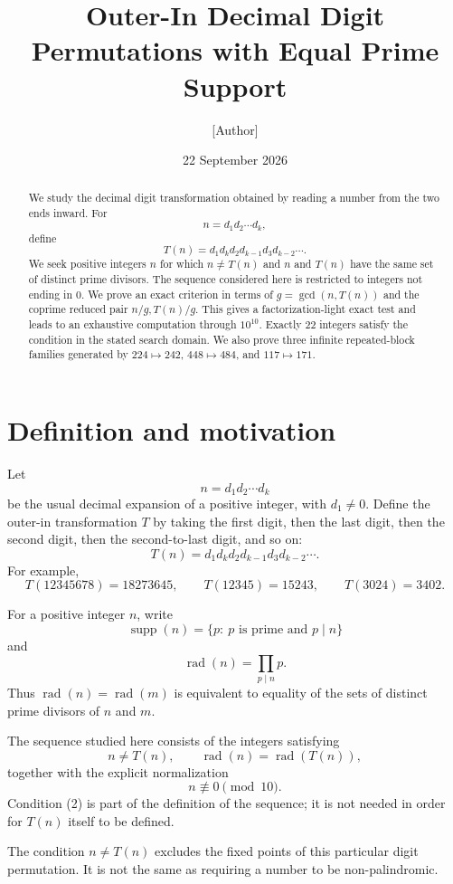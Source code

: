 \documentclass[11pt]{article}
\title{Outer-In Decimal Digit Permutations with Equal Prime Support}
\author{[Author]}
\date{22 September 2026}
\newcommand{\rad}{\operatorname{rad}}
\begin{document}
\maketitle

\begin{abstract}
We study the decimal digit transformation obtained by reading a number from the two ends inward. For
\[
n=d_1d_2\cdots d_k,
\]
define
\[
T(n)=d_1d_kd_2d_{k-1}d_3d_{k-2}\cdots .
\]
We seek positive integers \(n\) for which \(n\ne T(n)\) and \(n\) and \(T(n)\) have the same set of distinct prime divisors. The sequence considered here is restricted to integers not ending in \(0\). We prove an exact criterion in terms of \(g=\gcd(n,T(n))\) and the coprime reduced pair \(n/g,T(n)/g\). This gives a factorization-light exact test and leads to an exhaustive computation through \(10^{10}\). Exactly 22 integers satisfy the condition in the stated search domain. We also prove three infinite repeated-block families generated by \(224\mapsto242\), \(448\mapsto484\), and \(117\mapsto171\).
\end{abstract}

\section{Definition and motivation}

Let
\[
n=d_1d_2\cdots d_k
\]
be the usual decimal expansion of a positive integer, with \(d_1\ne0\). Define the outer-in transformation \(T\) by taking the first digit, then the last digit, then the second digit, then the second-to-last digit, and so on:
\[
T(n)=d_1d_kd_2d_{k-1}d_3d_{k-2}\cdots .
\]
For example,
\[
T(12345678)=18273645,\qquad
T(12345)=15243,\qquad
T(3024)=3402.
\]

For a positive integer \(n\), write
\[
\operatorname{supp}(n)=\{p:\ p\text{ is prime and }p\mid n\}
\]
and
\[
\rad(n)=\prod_{p\mid n}p.
\]
Thus \(\rad(n)=\rad(m)\) is equivalent to equality of the sets of distinct prime divisors of \(n\) and \(m\).

The sequence studied here consists of the integers satisfying
\[
n\ne T(n),\qquad \rad(n)=\rad(T(n)),
\tag{1}
\]
together with the explicit normalization
\[
n\not\equiv0\pmod {10}.
\tag{2}
\]
Condition (2) is part of the definition of the sequence; it is not needed in order for \(T(n)\) itself to be defined.

The condition \(n\ne T(n)\) excludes the fixed points of this particular digit permutation. It is not the same as requiring a number to be non-palindromic.
\end{document}
